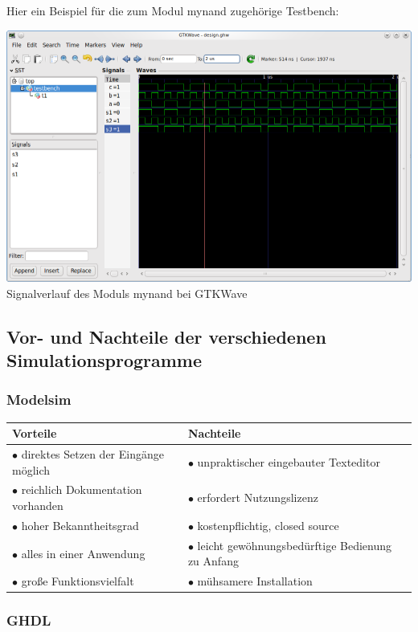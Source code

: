 \documentclass[a4paper, 11pt]{article}
\theoremstyle{definition}
\theoremstyle{plain}
\begin{document}
Hier ein Beispiel für die zum Modul mynand zugehörige Testbench:

\includegraphics[width = 1\textwidth]{gtkwave_mynand.png}
Signalverlauf des Moduls mynand bei GTKWave

\subsection{Vor- und Nachteile der verschiedenen Simulationsprogramme}

\subsubsection{Modelsim}

\begin{tabular}{p{7cm}|p{7cm}}
\textbf{Vorteile} & \textbf{Nachteile} \\
\hline 
$\bullet$ direktes Setzen der Eingänge möglich & $\bullet$ unpraktischer eingebauter Texteditor \\
$\bullet$ reichlich Dokumentation vorhanden & $\bullet$ erfordert Nutzungslizenz \\
$\bullet$ hoher Bekanntheitsgrad & $\bullet$ kostenpflichtig, closed source \\
$\bullet$ alles in einer Anwendung & $\bullet$ leicht gewöhnungsbedürftige Bedienung zu Anfang \\
$\bullet$ große Funktionsvielfalt & $\bullet$ mühsamere Installation
\end{tabular}

\subsubsection{GHDL}
\end{document}
